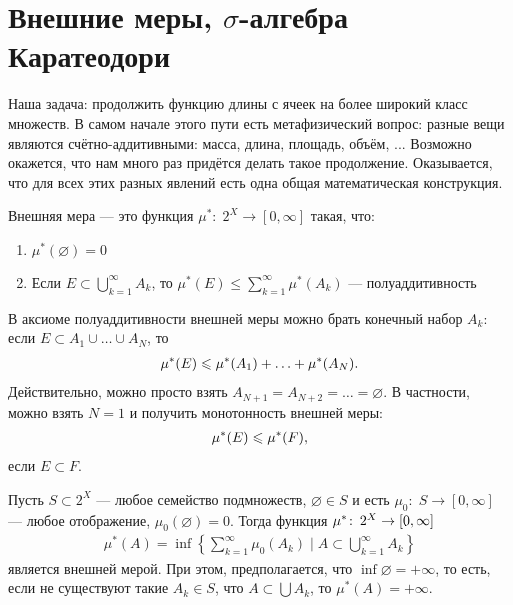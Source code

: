 
\section{Внешние меры, \texorpdfstring{$\sigma$}{sigma}-алгебра Каратеодори}

Наша задача: продолжить функцию длины с ячеек на более широкий класс множеств. В самом начале этого пути есть метафизический вопрос: разные вещи являются счётно-аддитивными: масса, длина, площадь, объём, ... Возможно окажется, что нам много раз придётся делать такое продолжение. Оказывается, что для всех этих разных явлений есть одна общая математическая конструкция.

\begin{df}
 Внешняя мера --- это функция $ \mu^\ast \colon\; 2^X \to [0, \infty] $ такая, что:
 \begin{enumerate}
  \item $ \mu^\ast(\varnothing) = 0 $
  \item Если $ E \subset \displaystyle \bigcup_{k=1}^\infty A_k $, то $ \displaystyle \mu^\ast\left( E \right) \leqslant \sum_{k=1}^\infty \mu^\ast(A_k) $ --- полуаддитивность
 \end{enumerate}
\end{df}
\begin{remrk*}
 В аксиоме полуаддитивности внешней меры можно брать конечный набор $A_k$: если $E \subset A_1 \cup \ldots \cup A_N$, то
 \begin{align*}
  \mu^\ast(E) \leqslant \mu^\ast(A_1) + \ldots + \mu^\ast(A_N)
 .\end{align*} Действительно, можно просто взять $A_{N+1} = A_{N+2} = \ldots = \varnothing$. В частности, можно взять $N = 1$ и получить монотонность внешней меры:
 \begin{align*}
  \mu^\ast(E) \leqslant \mu^\ast(F)
 ,\end{align*} если $E \subset F$.
\end{remrk*}
\begin{exmpl}
 \label{example:outer_measure_formed_by_a_set_function}
 Пусть $ S \subset 2^X $ --- любое семейство подмножеств, $ \varnothing \in S $ и есть $ \mu_0 \colon\; S \to [0, \infty] $ --- любое отображение, $ \mu_0(\varnothing) = 0 $. Тогда функция $\mu^\ast \colon\, 2^{X} \to [0,\infty]$
 \begin{align*}
  \mu^\ast(A) = \inf \left\{ \sum_{k=1}^\infty \mu_0(A_k) \mid A \subset \bigcup_{k=1}^\infty A_k  \right\} 
 \end{align*} является внешней мерой. При этом, предполагается, что $ \inf \varnothing = +\infty $, то есть, если не существуют такие $ A_k \in S $, что $ A \subset \bigcup A_k $, то $ \mu^\ast (A) = +\infty $.
\end{exmpl}
